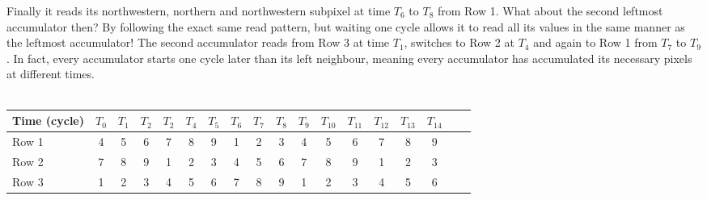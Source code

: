 Finally it reads its northwestern, northern and northwestern subpixel at time $T_{6}$ to $T_{8}$ from Row 1.
What about the second leftmost accumulator then? By following the exact same read pattern, but waiting one cycle allows it to read all its values in the same manner as the leftmost accumulator!
The second accumulator reads from Row 3 at time $T_{1}$, switches to Row 2 at $T_{4}$ and again to Row 1 from $T_{7}$ to $T_{9}$. 
In fact, every accumulator starts one cycle later than its left neighbour, meaning every accumulator has accumulated its necessary pixels at different times.
\\ \\
\begin{tabular}{l*{16}{c}r}
    Time (cycle)        & $T_{0}$ & $T_{1}$ & $T_{2}$ & $T_{2}$ & $T_{4}$  & $T_{5}$ & $T_{6}$ & $T_{7}$ & $T_{8}$ & $T_{9}$ & $T_{10}$ & $T_{11}$ & $T_{12}$ & $T_{13}$ & $T_{14}$\\
\hline
Row 1                   & \cellcolor{gray75} 4 & 5 & 6 & 7 & 8 & 9 & 1 & \cellcolor{gray75} 2 & \cellcolor{gray75} 3 & 4\cellcolor{gray75} & 5 & 6 & 7 & 8 & 9 & \\
Row 2                   & 7 & 8 & 9 & 1 & \cellcolor{gray75} 2 & \cellcolor{gray75} 3 & \cellcolor{gray75}4 & 5 & 6 & 7 & 8 & 9 & 1 & \cellcolor{gray75} 2 & \cellcolor{gray75} 3 & \\
Row 3                   & 1 & \cellcolor{gray75} 2 & \cellcolor{gray75} 3 & 4\cellcolor{gray75} & 5 & 6 & 7 & 8 & 9 & 1 & \cellcolor{gray75} 2 & \cellcolor{gray75} 3 & 4\cellcolor{gray75} & 5 & 6 & \\
\end{tabular}\\ \\ \\

